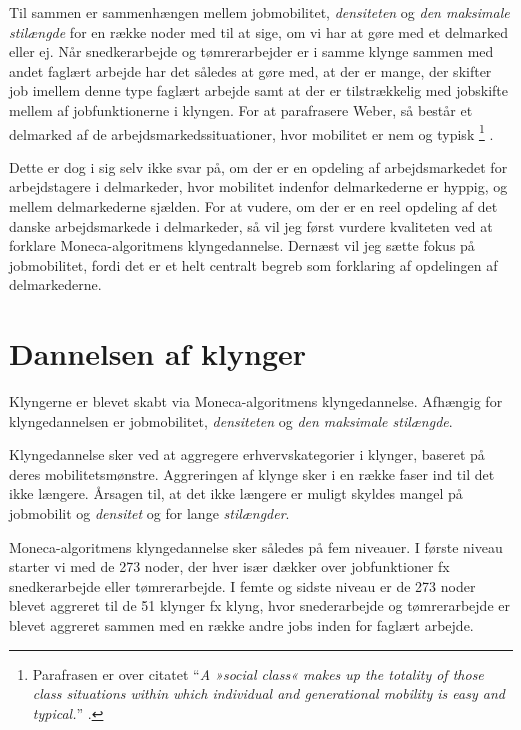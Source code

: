 Til sammen er sammenhængen mellem jobmobilitet, \emph{densiteten} og \emph{den maksimale stilængde} for en række noder med til at sige, om vi har at gøre med et delmarked eller ej. Når snedkerarbejde og tømrerarbejder er i samme klynge sammen med andet faglært arbejde har det således at gøre med, at der er mange, der skifter job imellem denne type faglært arbejde samt at der er tilstrækkelig med jobskifte mellem af jobfunktionerne i klyngen. For at parafrasere Weber, så består et delmarked af de arbejdsmarkedssituationer, hvor mobilitet er nem og typisk 
%
\footnote{Parafrasen er over citatet “\emph{A »social class« makes up the totality of those class situations within which individual and generational mobility is easy and typical.}” \parencite[302]{Weber1978}.}%
%
\parencite[302]{Weber1978}.

Dette er dog i sig selv ikke svar på, om der er en opdeling af arbejdsmarkedet for arbejdstagere i delmarkeder, hvor mobilitet indenfor delmarkederne er hyppig, og mellem delmarkederne sjælden. For at vudere, om der er en reel opdeling af det danske arbejdsmarkede i delmarkeder, så vil jeg først vurdere kvaliteten ved at forklare Moneca-algoritmens klyngedannelse. Dernæst vil jeg sætte fokus på jobmobilitet, fordi det er et helt centralt begreb som forklaring af opdelingen af delmarkederne.


\section{Dannelsen af klynger \label{delanalyse1_segmenteringsprocessen}}

Klyngerne er blevet skabt via Moneca-algoritmens klyngedannelse. Afhængig for klyngedannelsen er jobmobilitet, \emph{densiteten} og \emph{den maksimale stilængde}.

Klyngedannelse sker ved at aggregere erhvervskategorier i klynger, baseret på deres mobilitetsmønstre. Aggreringen af klynge sker i en række faser ind til det ikke længere. Årsagen til, at det ikke længere er muligt skyldes mangel på jobmobilit og \emph{densitet} og for lange \emph{stilængder}.

Moneca-algoritmens klyngedannelse sker således på fem niveauer. I første niveau starter vi med de 273 noder, der hver især dækker over jobfunktioner fx snedkerarbejde eller tømrerarbejde. I femte og sidste niveau er de 273 noder blevet aggreret til de 51 klynger fx klyng, hvor snederarbejde og tømrerarbejde er blevet aggreret sammen med en række andre jobs inden for faglært arbejde.

